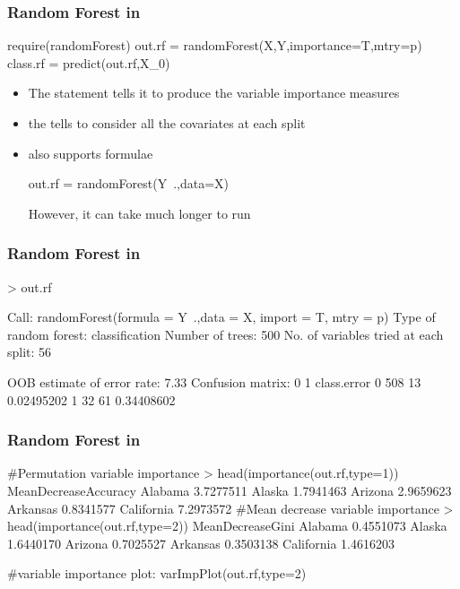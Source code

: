 \documentclass[12pt]{beamer}
\begin{document}
\begin{frame}[fragile]
\frametitle{Random Forest in }
\begin{blockcode}
require(randomForest)
out.rf   = randomForest(X,Y,importance=T,mtry=p)
class.rf = predict(out.rf,X_0)
\end{blockcode}


\begin{itemize}
\item The  statement tells it to produce the variable importance measures
\item the  tells  to consider all the covariates at each split

\item {} also supports formulae 
\begin{blockcode}
out.rf   = randomForest(Y~.,data=X)
\end{blockcode}
However, it can take much longer to run
\end{itemize}
\end{frame}

\begin{frame}[fragile]
\frametitle{Random Forest in }
\begin{blockcode}
> out.rf

Call:
randomForest(formula = Y~.,data = X, import = T, mtry = p)
               Type of random forest: classification
                     Number of trees: 500
No. of variables tried at each split: 56

        OOB estimate of  error rate: 7.33%
Confusion matrix:
    0  1 class.error
0 508 13  0.02495202
1  32 61  0.34408602
\end{blockcode}
\end{frame}


\begin{frame}[fragile]
\frametitle{Random Forest in }
\begin{blockcode}
#Permutation variable importance
> head(importance(out.rf,type=1))
           MeanDecreaseAccuracy
Alabama               3.7277511
Alaska                1.7941463
Arizona               2.9659623
Arkansas              0.8341577
California            7.2973572
#Mean decrease variable importance
> head(importance(out.rf,type=2))
           MeanDecreaseGini
Alabama           0.4551073
Alaska            1.6440170
Arizona           0.7025527
Arkansas          0.3503138
California        1.4616203

#variable importance plot:
varImpPlot(out.rf,type=2)
\end{blockcode}
\end{frame}
\end{document}
